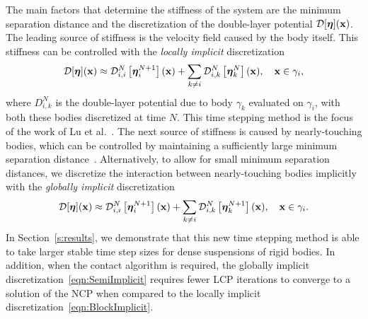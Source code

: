 \documentclass[AMA,STIX1COL]{WileyNJD-v2}
\begin{document}
The main factors that determine the stiffness of the system are the
minimum separation distance and the discretization of the double-layer
potential ${\mathcal{D}}[{\boldsymbol\eta}]({\mathbf{x}})$.  The leading source of stiffness is the
velocity field caused by the body itself. This stiffness can be
controlled with the {\em locally implicit} discretization
\begin{align}
  {\mathcal{D}}[{\boldsymbol\eta}]({\mathbf{x}}) \approx {\mathcal{D}}^{N}_{i,i}\left[{\boldsymbol\eta}_i^{N+1}\right]({\mathbf{x}}) + 
    \sum_{k \neq i} {\mathcal{D}}^{N}_{i,k}\left[{\boldsymbol\eta}_k^{N}\right]({\mathbf{x}}),
    \quad {\mathbf{x}} \in \gamma_i,
  \label{eqn:BlockImplicit}
\end{align}
where $D_{i,k}^N$ is the double-layer potential due to body $\gamma_k$
evaluated on $\gamma_i$, with both these bodies discretized at time $N$.
This time stepping method is the focus of the work of Lu et
al.~\cite{Lu2017}.  The next source of stiffness is caused by
nearly-touching bodies, which can be controlled by maintaining a
sufficiently large minimum separation distance~\cite{Lu2017}.
Alternatively, to allow for small minimum separation distances, we
discretize the interaction between nearly-touching bodies implicitly
with the {\em globally implicit} discretization
\begin{align}
  {\mathcal{D}}[{\boldsymbol\eta}]({\mathbf{x}}) \approx {\mathcal{D}}^{N}_{i,i}\left[{\boldsymbol\eta}_i^{N+1}\right]({\mathbf{x}}) + 
    \sum_{k \neq i} {\mathcal{D}}^{N}_{i,k}\left[{\boldsymbol\eta}_k^{N+1}\right]({\mathbf{x}}),
    \quad {\mathbf{x}} \in \gamma_i.
  \label{eqn:SemiImplicit}
\end{align}
In Section~\ref{s:results}, we demonstrate that this new time stepping
method is able to take larger stable time step sizes for dense
suspensions of rigid bodies.  In addition, when the contact algorithm is
required, the globally implicit discretization~\eqref{eqn:SemiImplicit}
requires fewer LCP iterations to converge to a solution of the NCP when
compared to the locally implicit
discretization~\eqref{eqn:BlockImplicit}.
\end{document}
